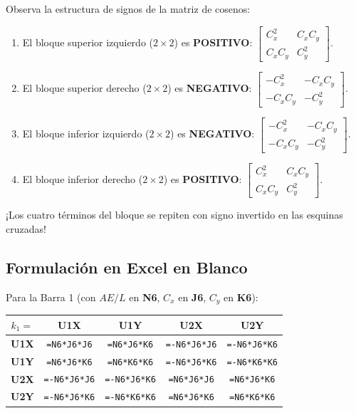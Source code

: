\documentclass[10pt,a4paper]{article}
\begin{document}
\begin{notebookbox}
Observa la estructura de signos de la matriz de cosenos:
\begin{enumerate}
    \item El bloque superior izquierdo ($2\times 2$) es \textbf{POSITIVO}: $\begin{bmatrix} C_x^2 & C_x C_y \\ C_x C_y & C_y^2 \end{bmatrix}$.
    \item El bloque superior derecho ($2\times 2$) es \textbf{NEGATIVO}: $\begin{bmatrix} -C_x^2 & -C_x C_y \\ -C_x C_y & -C_y^2 \end{bmatrix}$.
    \item El bloque inferior izquierdo ($2\times 2$) es \textbf{NEGATIVO}: $\begin{bmatrix} -C_x^2 & -C_x C_y \\ -C_x C_y & -C_y^2 \end{bmatrix}$.
    \item El bloque inferior derecho ($2\times 2$) es \textbf{POSITIVO}: $\begin{bmatrix} C_x^2 & C_x C_y \\ C_x C_y & C_y^2 \end{bmatrix}$.
\end{enumerate}
¡Los cuatro términos del bloque se repiten con signo invertido en las esquinas cruzadas!
\end{notebookbox}

\subsection{Formulación en Excel en Blanco}
Para la Barra 1 (con $AE/L$ en \textbf{N6}, $C_x$ en \textbf{J6}, $C_y$ en \textbf{K6}):

\begin{center}
\small
\begin{tabular}{|c|c|c|c|c|}
\hline
\rowcolor{pastelPeach}
$k_1=$ & \textbf{U1X} & \textbf{U1Y} & \textbf{U2X} & \textbf{U2Y} \\
\hline
\textbf{U1X} & \texttt{=N6*J6*J6} & \texttt{=N6*J6*K6} & \texttt{=-N6*J6*J6} & \texttt{=-N6*J6*K6} \\
\hline
\textbf{U1Y} & \texttt{=N6*J6*K6} & \texttt{=N6*K6*K6} & \texttt{=-N6*J6*K6} & \texttt{=-N6*K6*K6} \\
\hline
\textbf{U2X} & \texttt{=-N6*J6*J6} & \texttt{=-N6*J6*K6} & \texttt{=N6*J6*J6} & \texttt{=N6*J6*K6} \\
\hline
\textbf{U2Y} & \texttt{=-N6*J6*K6} & \texttt{=-N6*K6*K6} & \texttt{=N6*J6*K6} & \texttt{=N6*K6*K6} \\
\hline
\end{tabular}
\end{center}
\end{document}
